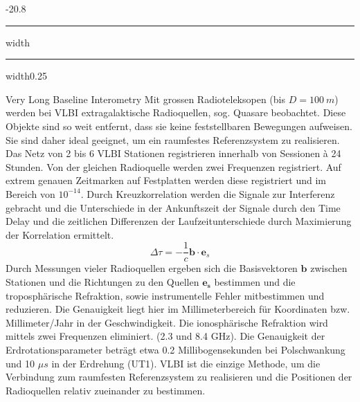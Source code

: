 \documentclass[9pt, landscape, fleqn]{scrartcl}
\makeatletter
\renewcommand{\subsection}{\@startsection{subsection}{1}{0mm}%
{-2\baselineskip}{0.8\baselineskip}%
{\hrule depth 0.2pt width\columnwidth\hrule depth0.75pt
width0.25\columnwidth\vspace*{1.2em}\large\bfseries\rmfamily}}
\makeatother
\begin{document}
\begin{multicols*}{3}
\subsection{Very Long Baseline Interometry}
Mit grossen Radioteleksopen (bis $D=100~m$) werden bei VLBI extragalaktische Radioquellen, sog. Quasare beobachtet. Diese Objekte sind so weit entfernt, dass sie keine feststellbaren Bewegungen aufweisen. Sie sind daher ideal geeignet, um ein raumfestes Referenzsystem zu realisieren. Das Netz von 2 bis 6 VLBI Stationen registrieren innerhalb von Sessionen à 24 Stunden. Von der gleichen Radioquelle werden zwei Frequenzen registriert. Auf extrem genauen Zeitmarken auf Festplatten werden diese registriert und im Bereich von $10^{-14}$. Durch Kreuzkorrelation werden die Signale zur Interferenz gebracht und die Unterschiede in der Ankunftszeit der Signale durch den Time Delay und die zeitlichen Differenzen der Laufzeitunterschiede durch Maximierung der Korrelation ermittelt. 
\begin{equation*}
    \Delta \tau = -\frac{1}{c}\mathbf{b}\cdot \mathbf{e}_s
\end{equation*}
Durch Messungen vieler Radioquellen ergeben sich die Basisvektoren $\mathbf{b}$ zwischen Stationen und die Richtungen zu den Quellen $\mathbf{e_s}$ bestimmen und die troposphärische Refraktion, sowie instrumentelle Fehler mitbestimmen und reduzieren. Die Genauigkeit liegt hier im Millimeterbereich für Koordinaten bzw. Millimeter/Jahr in der Geschwindigkeit. Die ionosphärische Refraktion wird mittels zwei Frequenzen eliminiert. (2.3 und 8.4 GHz). Die Genauigkeit der Erdrotationsparameter beträgt etwa 0.2 Millibogensekunden bei Polschwankung und 10 $\mu s$ in der Erdrehung (UT1). VLBI ist die einzige Methode, um die Verbindung zum raumfesten Referenzsystem zu realisieren und die Positionen der Radioquellen relativ zueinander zu bestimmen.


\end{multicols*}
\end{document}
